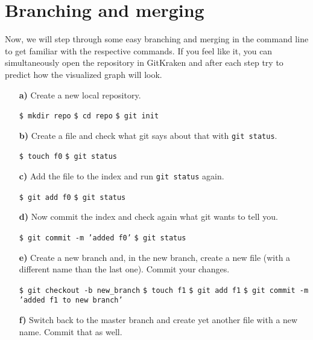 \documentclass[11pt]{article}
\begin{document}
\section*{Branching and merging}
Now, we will step through some easy branching and merging in the command line to get familiar with the respective commands. If you feel like it, you can simultaneously open the repository in GitKraken and after each step try to predict how the visualized graph will look.

\begin{itemize}
\item[\bf{a)}] Create a new local repository.
\begin{framed}
\texttt{\$ mkdir repo} \newline
\texttt{\$ cd repo} \newline
\texttt{\$ git init}
\end{framed}
\item[\bf{b)}] Create a file and check what git says about that with \texttt{git status}.
\begin{framed}
\texttt{\$ touch f0} \newline
\texttt{\$ git status}
\end{framed}
\item[\bf{c)}] Add the file to the index and run \texttt{git status} again.
\begin{framed}
\texttt{\$ git add f0} \newline
\texttt{\$ git status}
\end{framed}
\item[\bf{d)}] Now commit the index and check again what git wants to tell you.
\begin{framed}
\texttt{\$ git commit -m 'added f0'} \newline
\texttt{\$ git status}
\end{framed}
\item[\bf{e)}] Create a new branch and, in the new branch, create a new file (with a different name than the last one). Commit your changes.
\begin{framed}
\texttt{\$ git checkout -b new\_branch} \newline
\texttt{\$ touch f1} \newline
\texttt{\$ git add f1} \newline
\texttt{\$ git commit -m 'added f1 to new branch'}
\end{framed}
\item[\bf{f)}] Switch back to the master branch and create yet another file with a new name. Commit that as well.

\end{itemize}
\end{document}
